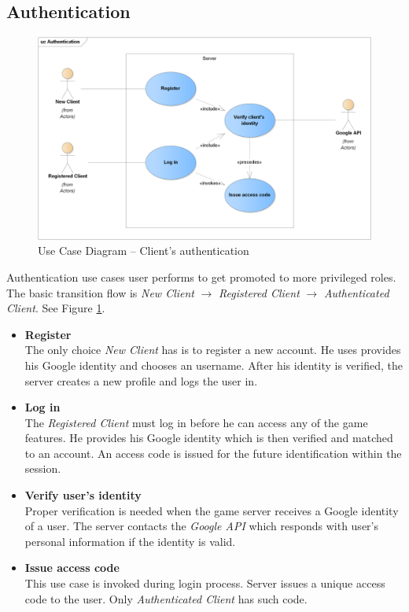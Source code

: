 	\subsection{Authentication}	
	\begin{figure}[h]	
		\includegraphics[width=\textwidth]{figures/UC_Authentication}
		\centering			
		\caption{Use Case Diagram -- Client's authentication}
		\label{fig:ucauth}
	\end{figure}
	\noindent Authentication use cases user performs to get promoted to more privileged roles. The basic transition flow is \textit{New Client} $\rightarrow$ \textit{Registered Client} $\rightarrow$ \textit{Authenticated Client}. See Figure \ref{fig:ucauth}.
	
	\begin{itemize}
		\item \textbf{Register} \\
		The only choice \textit{New Client} has is to register a new account. He uses provides his Google identity and chooses an username. After his identity is verified, the server creates a new profile and logs the user in.
		
		\item \textbf{Log in} \\
		The \textit{Registered Client} must log in before he can access any of the game features. He provides his Google identity which is then verified and matched to an account. An access code is issued for the future identification within the session.		
		
		\item \textbf{Verify user's identity} \\
		Proper verification is needed when the game server receives a Google identity of a user. The server contacts the \textit{Google API} which responds with user's personal information if the identity is valid.
		
		\item \textbf{Issue access code} \\ 
		This use case is invoked during login process. Server issues a unique access code to the user. Only \textit{Authenticated Client} has such code.
	\end{itemize}
	
